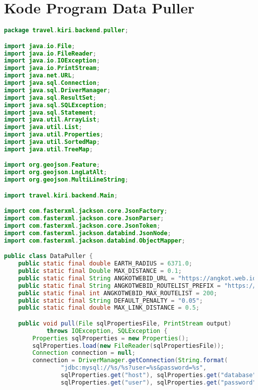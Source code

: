 \chapter{Kode Program Data Puller}
\label{app:B}

\singlespacing 
%
%
\begin{lstlisting}[language=Java,basicstyle=\tiny,caption=DataPuller.java]
package travel.kiri.backend.puller;

import java.io.File;
import java.io.FileReader;
import java.io.IOException;
import java.io.PrintStream;
import java.net.URL;
import java.sql.Connection;
import java.sql.DriverManager;
import java.sql.ResultSet;
import java.sql.SQLException;
import java.sql.Statement;
import java.util.ArrayList;
import java.util.List;
import java.util.Properties;
import java.util.SortedMap;
import java.util.TreeMap;

import org.geojson.Feature;
import org.geojson.LngLatAlt;
import org.geojson.MultiLineString;

import travel.kiri.backend.Main;

import com.fasterxml.jackson.core.JsonFactory;
import com.fasterxml.jackson.core.JsonParser;
import com.fasterxml.jackson.core.JsonToken;
import com.fasterxml.jackson.databind.JsonNode;
import com.fasterxml.jackson.databind.ObjectMapper;

public class DataPuller {
	public static final double EARTH_RADIUS = 6371.0;
	public static final Double MAX_DISTANCE = 0.1;
	public static final String ANGKOTWEBID_URL = "https://angkot.web.id/route/transportation/%s.json";
	public static final String ANGKOTWEBID_ROUTELIST_PREFIX = "https://angkot.web.id/route/transportation-list.json?id=";
	public static final int ANGKOTWEBID_MAX_ROUTELIST = 200;
	public static final String DEFAULT_PENALTY = "0.05";
	public static final double MAX_LINK_DISTANCE = 0.5;

	public void pull(File sqlPropertiesFile, PrintStream output)
			throws IOException, SQLException {
		Properties sqlProperties = new Properties();
		sqlProperties.load(new FileReader(sqlPropertiesFile));
		Connection connection = null;
		connection = DriverManager.getConnection(String.format(
				"jdbc:mysql://%s/%s?user=%s&password=%s",
				sqlProperties.get("host"), sqlProperties.get("database"),
				sqlProperties.get("user"), sqlProperties.get("password")));
		

\end{lstlisting}
